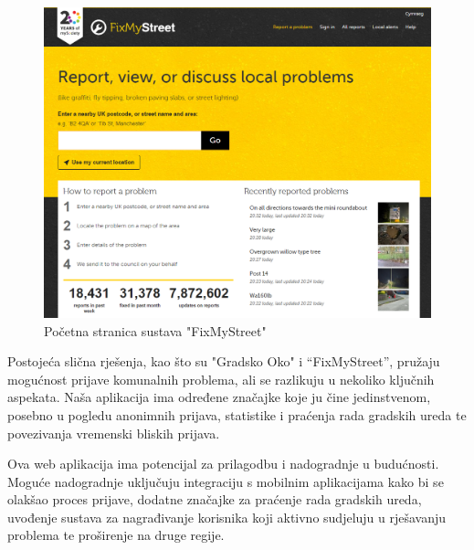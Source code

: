 \begin{figure}[H]
	\includegraphics[scale=0.4]{slike/FixMyStreet.png} %
	\centering
	\caption{Početna stranica sustava "FixMyStreet"}
	\label{fig:FixMyStreet}
\end{figure}


\newpage

\noindent Postojeća slična rješenja, kao što su "Gradsko Oko" i “FixMyStreet”, pružaju mogućnost prijave komunalnih problema, ali se razlikuju u nekoliko ključnih aspekata. Naša aplikacija ima određene značajke koje ju čine jedinstvenom, posebno u pogledu anonimnih prijava, statistike i praćenja rada gradskih ureda te povezivanja vremenski bliskih prijava.


\noindent Ova web aplikacija ima potencijal za prilagodbu i nadogradnje u budućnosti. Moguće nadogradnje uključuju integraciju s mobilnim aplikacijama kako bi se olakšao proces prijave, dodatne značajke za praćenje rada gradskih ureda, uvođenje sustava za nagrađivanje korisnika koji aktivno sudjeluju u rješavanju problema te proširenje na druge regije.

\eject






